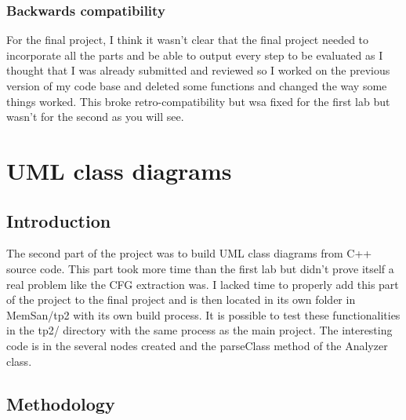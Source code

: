 \documentclass[conference,compsoc]{IEEEtran}
\begin{document}
\subsubsection{Backwards compatibility}

 For the final project, I think it wasn't
 clear that the final project needed to incorporate all the parts and be able to output every step to be evaluated as I thought
 that I was already submitted and reviewed so I worked on the previous version of my code base and deleted some functions and changed the way some things worked.
 This broke retro-compatibility but wsa fixed for the first lab but wasn't for the second as you will see.

\section{UML class diagrams}
\subsection{Introduction}

The second part of the project was to build UML class diagrams from
 C++ source code. This part took more time than the first lab but didn't
 prove itself a real problem like the CFG extraction was. I lacked time to
 properly add this part of the project to the final project and is then located
 in its own folder in MemSan/tp2 with its own build process. It is possible to test
 these functionalities in the tp2/ directory with the same process as the main project.
 The interesting code is in the several nodes created and the parseClass method of the Analyzer class.

\subsection{Methodology}
\end{document}
